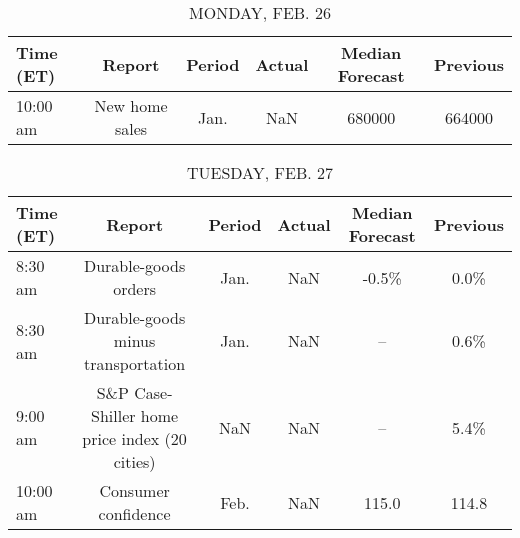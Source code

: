 \documentclass{article}%
\begin{document}
%
\normalsize%


\begin{table}[htbp]%
\caption{MONDAY, FEB. 26}%
\centering%
\begin{adjustbox}{width=1\textwidth}%
\begin{tabular}{lccccc}
\toprule
Time (ET) &         Report & Period & Actual & Median Forecast & Previous \\
\midrule
 10:00 am & New home sales &   Jan. &    NaN &          680000 &   664000 \\
\bottomrule
\end{tabular}
%
\end{adjustbox}%
\end{table}

%


\begin{table}[htbp]%
\caption{TUESDAY, FEB. 27}%
\centering%
\begin{adjustbox}{width=1\textwidth}%
\begin{tabular}{lccccc}
\toprule
Time (ET) &                                        Report & Period & Actual & Median Forecast & Previous \\
\midrule
  8:30 am &                          Durable-goods orders &   Jan. &    NaN &           -0.5\% &     0.0\% \\
  8:30 am &            Durable-goods minus transportation &   Jan. &    NaN &              -- &     0.6\% \\
  9:00 am & S\&P Case-Shiller home price index (20 cities) &    NaN &    NaN &              -- &     5.4\% \\
 10:00 am &                           Consumer confidence &   Feb. &    NaN &           115.0 &    114.8 \\
\bottomrule
\end{tabular}
%
\end{adjustbox}%
\end{table}

%
\end{document}
